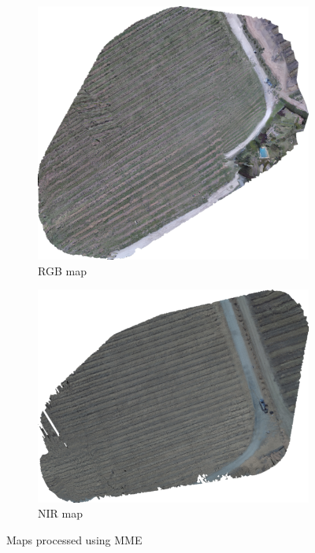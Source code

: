 \begin{appendices}
\begin{figure}[H]
\begin{subfigure}{0.5\textwidth}
\centering
\includegraphics[scale=0.6]{images/map_rgb_large.png}
\caption{RGB map}
\end{subfigure}
\begin{subfigure}{0.5\textwidth}
\centering
\includegraphics[scale=0.6]{images/map_ir_large.png}
\caption{NIR map}
\end{subfigure}
\caption{Maps processed using MME \cite{mme}}
\label{fig:app_maps}
\end{figure}


\end{appendices}

